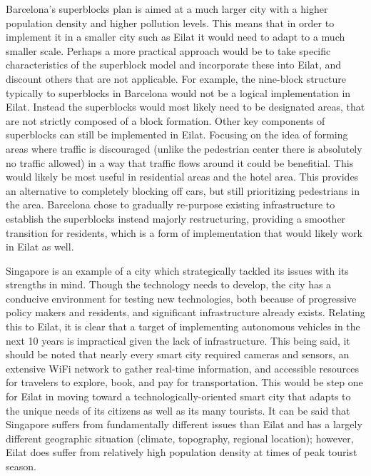 \documentclass[12pt]{article}                               %
\begin{document}
Barcelona's superblocks plan is aimed at a much larger city with a higher population density and higher pollution levels. This means that in order to implement it in a smaller city such as Eilat it would need to adapt to a much smaller scale. Perhaps a more practical approach would be to take specific characteristics of the superblock model and incorporate these into Eilat, and discount others that are not applicable. For example, the nine-block structure typically to superblocks in Barcelona would not be a logical implementation in Eilat. Instead the superblocks would most likely need to be designated areas, that are not strictly composed of a block formation. Other key components of superblocks can still be implemented in Eilat. Focusing on the idea of forming areas where traffic is discouraged (unlike the pedestrian center there is absolutely no traffic allowed) in a way that traffic flows around it could be benefitial. This would likely be most useful in residential areas and the hotel area. This provides an alternative to completely blocking off cars, but still prioritizing pedestrians in the area. Barcelona chose to gradually re-purpose existing infrastructure to establish the superblocks instead majorly restructuring, providing a smoother transition for residents, which is a form of implementation that would likely work in Eilat as well. 

Singapore is an example of a city which strategically tackled its issues with its strengths in mind. Though the technology needs to develop, the city has a conducive environment for testing new technologies, both because of progressive policy makers and residents, and significant infrastructure already exists. Relating this to Eilat, it is clear that a target of implementing autonomous vehicles in the next 10 years is impractical given the lack of infrastructure. This being said, it should be noted that nearly every smart city required cameras and sensors, an extensive WiFi network to gather real-time information, and accessible resources for travelers to explore, book, and pay for transportation. This would be step one for Eilat in moving toward a technologically-oriented smart city that adapts to the unique needs of its citizens as well as its many tourists. It can be said that Singapore suffers from fundamentally different issues than Eilat and has a largely different geographic situation (climate, topography, regional location); however, Eilat does suffer from relatively high population density at times of peak tourist season. 
\end{document}
